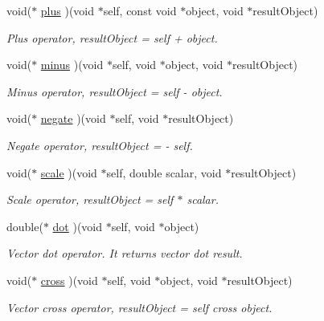 \begin{CompactItemize}
void($\ast$ \hyperlink{structdrdc__lPosn__t_bbb83aef73c231ac706d12132d4af780}{plus} )(void $\ast$self, const void $\ast$object, void $\ast$resultObject)
\begin{CompactList}\small\item\em Plus operator, resultObject = self + object. \item\end{CompactList}\item 
void($\ast$ \hyperlink{structdrdc__lPosn__t_825ce63786dc54e858080283e77d094c}{minus} )(void $\ast$self, void $\ast$object, void $\ast$resultObject)
\begin{CompactList}\small\item\em Minus operator, resultObject = self - object. \item\end{CompactList}\item 
void($\ast$ \hyperlink{structdrdc__lPosn__t_f448fb95bac4105a59f47d805426a184}{negate} )(void $\ast$self, void $\ast$resultObject)
\begin{CompactList}\small\item\em Negate operator, resultObject = - self. \item\end{CompactList}\item 
void($\ast$ \hyperlink{structdrdc__lPosn__t_b841f4ece0abc002c4a20591bd18a25b}{scale} )(void $\ast$self, double scalar, void $\ast$resultObject)
\begin{CompactList}\small\item\em Scale operator, resultObject = self $\ast$ scalar. \item\end{CompactList}\item 
double($\ast$ \hyperlink{structdrdc__lPosn__t_29d500e7d47448506ca584e046a265bf}{dot} )(void $\ast$self, void $\ast$object)
\begin{CompactList}\small\item\em Vector dot operator. It returns vector dot result. \item\end{CompactList}\item 
void($\ast$ \hyperlink{structdrdc__lPosn__t_a598f7e243438190e4812ffa9cef2d97}{cross} )(void $\ast$self, void $\ast$object, void $\ast$resultObject)
\begin{CompactList}\small\item\em Vector cross operator, resultObject = self cross object. \item\end{CompactList}\item 

\end{CompactItemize}
